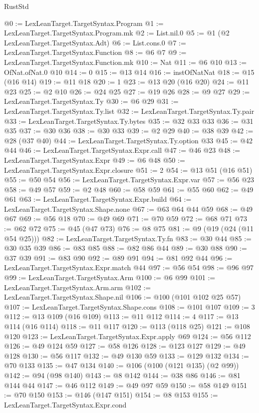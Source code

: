 \begin{lexlean}{RustStd}
\begin{coremodule}
{\begin{coremodule}
{{{{{{{{@0 := LexLeanTarget.TargetSyntax.Program
@1 := LexLeanTarget.TargetSyntax.Program.mk
@2 := List.nil.{0}
@5 := @1 (@2 LexLeanTarget.TargetSyntax.Adt)
@6 := List.cons.{0}
@7 := LexLeanTarget.TargetSyntax.Function
@8 := @6 @7
@9 := LexLeanTarget.TargetSyntax.Function.mk
@10 := Nat
@11 := @6 @10
@13 := OfNat.ofNat.{0} @10
@14 := 0
@15 := @13 @14
@16 := instOfNatNat
@18 := @15 (@16 @14)
@19 := @11 @18
@20 := 1
@23 := @13 @20 (@16 @20)
@24 := @11 @23
@25 := @2 @10
@26 := @24 @25
@27 := @19 @26
@28 := @9 @27
@29 := LexLeanTarget.TargetSyntax.Ty
@30 := @6 @29
@31 := LexLeanTarget.TargetSyntax.Ty.list
@32 := LexLeanTarget.TargetSyntax.Ty.pair
@33 := LexLeanTarget.TargetSyntax.Ty.bytes
@35 := @32 @33 @33
@36 := @31 @35
@37 := @30 @36
@38 := @30 @33
@39 := @2 @29
@40 := @38 @39
@42 := @28 (@37 @40)
@44 := LexLeanTarget.TargetSyntax.Ty.option @33
@45 := @42 @44
@46 := LexLeanTarget.TargetSyntax.Expr.call
@47 := @46 @23
@48 := LexLeanTarget.TargetSyntax.Expr
@49 := @6 @48
@50 := LexLeanTarget.TargetSyntax.Expr.closure
@51 := 2
@54 := @13 @51 (@16 @51)
@55 := @50 @54
@56 := LexLeanTarget.TargetSyntax.Expr.var
@57 := @56 @23
@58 := @49 @57
@59 := @2 @48
@60 := @58 @59
@61 := @55 @60
@62 := @49 @61
@63 := LexLeanTarget.TargetSyntax.Expr.build
@64 := LexLeanTarget.TargetSyntax.Shape.none
@67 := @63 @64 @44 @59
@68 := @49 @67
@69 := @56 @18
@70 := @49 @69
@71 := @70 @59
@72 := @68 @71
@73 := @62 @72
@75 := @45 (@47 @73)
@76 := @8 @75
@81 := @9 (@19 (@24 (@11 @54 @25)))
@82 := LexLeanTarget.TargetSyntax.Ty.fn
@83 := @30 @44
@85 := @30 @35 @39
@86 := @83 @85
@88 := @82 @86 @44
@89 := @30 @88
@90 := @37 @39
@91 := @83 @90
@92 := @89 @91
@94 := @81 @92 @44
@96 := LexLeanTarget.TargetSyntax.Expr.match @44
@97 := @56 @54
@98 := @96 @97
@99 := LexLeanTarget.TargetSyntax.Arm
@100 := @6 @99
@101 := LexLeanTarget.TargetSyntax.Arm.arm
@102 := LexLeanTarget.TargetSyntax.Shape.nil
@106 := @100 (@101 @102 @25 @57)
@107 := LexLeanTarget.TargetSyntax.Shape.cons
@108 := @101 @107
@109 := 3
@112 := @13 @109 (@16 @109)
@113 := @11 @112
@114 := 4
@117 := @13 @114 (@16 @114)
@118 := @11 @117
@120 := @113 (@118 @25)
@121 := @108 @120
@123 := LexLeanTarget.TargetSyntax.Expr.apply @69
@124 := @56 @112
@126 := @49 @124 @59
@127 := @58 @126
@128 := @123 @127
@129 := @49 @128
@130 := @56 @117
@132 := @49 @130 @59
@133 := @129 @132
@134 := @70 @133
@135 := @47 @134
@140 := @106 (@100 (@121 @135) (@2 @99))
@142 := @94 (@98 @140)
@143 := @8 @142
@144 := @38 @86
@146 := @81 @144 @44
@147 := @46 @112
@149 := @49 @97 @59
@150 := @58 @149
@151 := @70 @150
@153 := @146 (@147 @151)
@154 := @8 @153
@155 := LexLeanTarget.TargetSyntax.Expr.cond
}}}}}}}}
\end{coremodule}}
\end{coremodule}
\end{lexlean}
